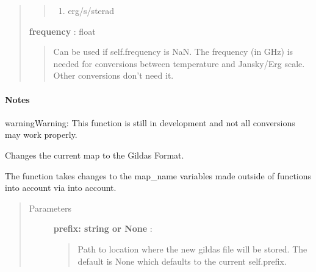 \documentclass[a4paper,10pt,english]{sphinxmanual}
\begin{document}
\begin{fulllineitems}
\begin{fulllineitems}
\begin{quote}
\begin{description}
\begin{quote}
\begin{description}
\begin{enumerate}
\item {} 
erg/s/sterad 

\end{enumerate}

\end{description}
\end{quote}

\textbf{frequency} : float
\begin{quote}

Can be used if self.frequency is NaN. The frequency (in GHz) is
needed for conversions between temperature and Jansky/Erg scale.
Other conversions don't need it.
\end{quote}

\end{description}\end{quote}
\paragraph{Notes}

\begin{notice}{warning}{Warning:}
This function is still in development and not all
conversions may work properly.
\end{notice}

\end{fulllineitems}


\begin{fulllineitems}
\label{maps:astrolyze.maps.fits.FitsMap.toGildas}
Changes the current map to the Gildas Format.

The function takes changes to the map\_name variables
made outside of functions into account via
{\hyperref[maps:astrolyze.maps.main.Map.returnName]{}} into account.
\begin{quote}\begin{description}
\item[{Parameters }] \leavevmode
\textbf{prefix: string or None} :
\begin{quote}

Path to location where the new gildas file will be stored.
The default is None which defaults to the current self.prefix.
\end{quote}

\end{description}\end{quote}

\end{fulllineitems}
\end{fulllineitems}
\end{document}
